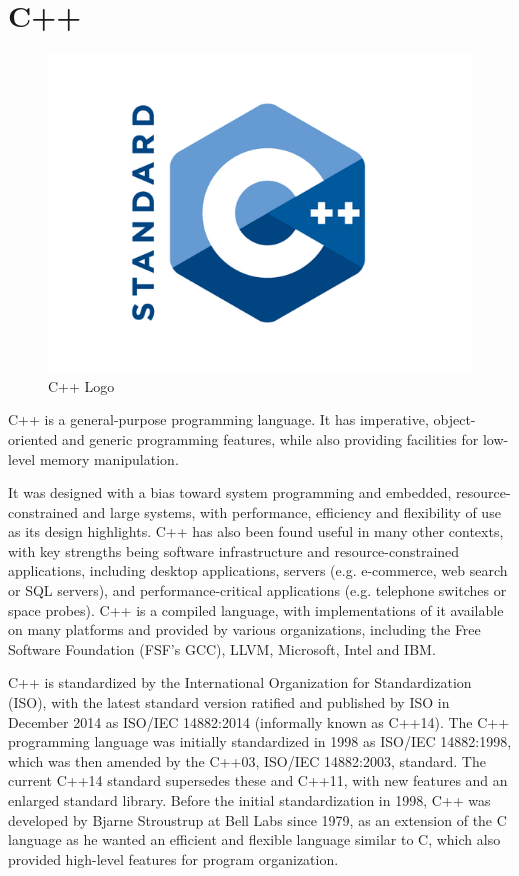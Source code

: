 \section{C++}

\begin{figure}[H]
	\centering \includegraphics[scale=0.3]{images/c++.png}
	\caption{C++ Logo}
\end{figure}

C++ is a general-purpose programming language. It has imperative, object-oriented and generic programming features, while also providing facilities for low-level memory manipulation.

It was designed with a bias toward system programming and embedded, resource-constrained and large systems, with performance, efficiency and flexibility of use as its design highlights. C++ has also been found useful in many other contexts, with key strengths being software infrastructure and resource-constrained applications, including desktop applications, servers (e.g. e-commerce, web search or SQL servers), and performance-critical applications (e.g. telephone switches or space probes). C++ is a compiled language, with implementations of it available on many platforms and provided by various organizations, including the Free Software Foundation (FSF's GCC), LLVM, Microsoft, Intel and IBM.

C++ is standardized by the International Organization for Standardization (ISO), with the latest standard version ratified and published by ISO in December 2014 as ISO/IEC 14882:2014 (informally known as C++14). The C++ programming language was initially standardized in 1998 as ISO/IEC 14882:1998, which was then amended by the C++03, ISO/IEC 14882:2003, standard. The current C++14 standard supersedes these and C++11, with new features and an enlarged standard library. Before the initial standardization in 1998, C++ was developed by Bjarne Stroustrup at Bell Labs since 1979, as an extension of the C language as he wanted an efficient and flexible language similar to C, which also provided high-level features for program organization.

